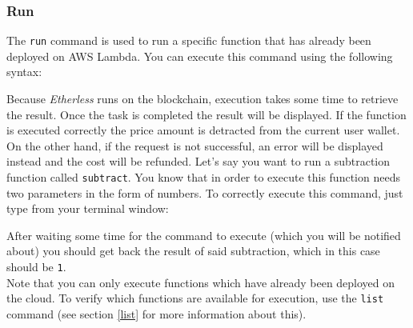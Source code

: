\subsubsection{Run}
The \texttt{run} command is used to run a specific function that has already been deployed on AWS Lambda. You can execute this command using the following syntax: \\
\begin{center}
\end{center}
Because \textit{Etherless} runs on the blockchain, execution takes some time to retrieve the result. Once the task is completed the result will be displayed. If the function is executed correctly the price amount is detracted from the current user wallet. On the other hand, if the request is not successful, an error will be displayed instead and the cost will be refunded.
Let's say you want to run a subtraction function called \texttt{subtract}. You know that in order to execute this function needs two parameters in the form of numbers. To correctly execute this command, just type from your terminal window:
\begin{center}
\end{center}
After waiting some time for the command to execute (which you will be notified about) you should get back the result of said subtraction, which in this case should be \texttt{1}. \\
Note that you can only execute functions which have already been deployed on the cloud. To verify which functions are available for execution, use the \texttt{list} command (see section \ref{list} for more information about this).

